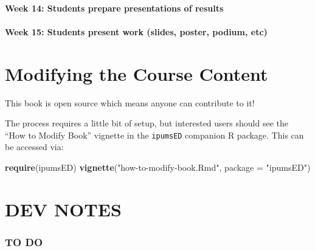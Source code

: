 \documentclass[
]{book}
\newenvironment{Shaded}{\begin{snugshade}}{\end{snugshade}}
\newcommand{\AttributeTok}[1]{\textcolor[rgb]{0.13,0.29,0.53}{#1}}
\newcommand{\FunctionTok}[1]{\textcolor[rgb]{0.13,0.29,0.53}{\textbf{#1}}}
\newcommand{\NormalTok}[1]{#1}
\newcommand{\StringTok}[1]{\textcolor[rgb]{0.31,0.60,0.02}{#1}}
\begin{document}
\hypertarget{week-14-students-prepare-presentations-of-results}{%
\subsubsection*{Week 14: Students prepare presentations of results}\label{week-14-students-prepare-presentations-of-results}}

\hypertarget{week-15-students-present-work-slides-poster-podium-etc}{%
\subsubsection*{Week 15: Students present work (slides, poster, podium, etc)}\label{week-15-students-present-work-slides-poster-podium-etc}}

\hypertarget{modifying-the-course-content}{%
\chapter{Modifying the Course Content}\label{modifying-the-course-content}}

This book is open source which means anyone can contribute to it!

The process requires a little bit of setup, but interested users should see the
``How to Modify Book'' vignette in the \texttt{ipumsED} companion R package. This can
be accessed via:

\begin{Shaded}
\begin{Highlighting}[]
\FunctionTok{require}\NormalTok{(ipumsED)}
\FunctionTok{vignette}\NormalTok{(}\StringTok{"how{-}to{-}modify{-}book.Rmd"}\NormalTok{, }\AttributeTok{package =} \StringTok{"ipumsED"}\NormalTok{)}
\end{Highlighting}
\end{Shaded}

\hypertarget{dev-notes}{%
\chapter*{DEV NOTES}\label{dev-notes}}

\hypertarget{to-do}{%
\subsection*{TO DO}\label{to-do}}
\end{document}
